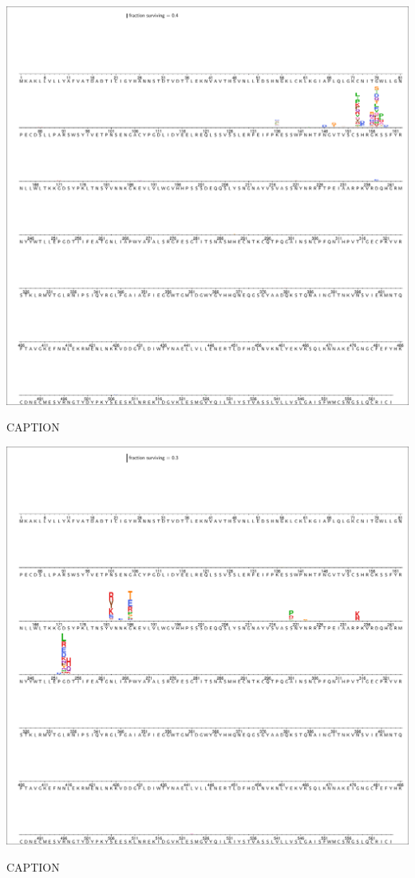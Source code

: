 \documentclass[11pt]{article}
\begin{document}
\begin{suppfigure}
\centerline{\includegraphics[trim=0.1cm 0.02cm 0.1cm 0.03cm,clip=true,width=\textwidth]{figs/logoplots/H17L19_fracsurvive.pdf}}
\caption{\label{suppfig:H17L19logo}
CAPTION}
\end{suppfigure}

\begin{suppfigure}
\centerline{\includegraphics[trim=0.1cm 0.02cm 0.1cm 0.03cm,clip=true,width=\textwidth]{figs/logoplots/H17L10_fracsurvive.pdf}}
\caption{\label{suppfig:H17L10logo}
CAPTION}
\end{suppfigure}
\end{document}
